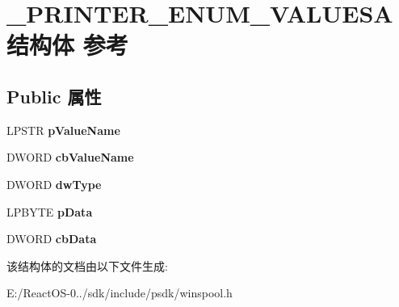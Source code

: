 \hypertarget{struct___p_r_i_n_t_e_r___e_n_u_m___v_a_l_u_e_s_a}{}\section{\+\_\+\+P\+R\+I\+N\+T\+E\+R\+\_\+\+E\+N\+U\+M\+\_\+\+V\+A\+L\+U\+E\+S\+A结构体 参考}
\label{struct___p_r_i_n_t_e_r___e_n_u_m___v_a_l_u_e_s_a}
\subsection*{Public 属性}
\begin{DoxyCompactItemize}
\item 
\mbox{\label{struct___p_r_i_n_t_e_r___e_n_u_m___v_a_l_u_e_s_a_aab628bb2cfed95c7d6f6a1a66b0fe324}} 
L\+P\+S\+TR {\bfseries p\+Value\+Name}
\item 
\mbox{\label{struct___p_r_i_n_t_e_r___e_n_u_m___v_a_l_u_e_s_a_a6e05ad750c02dfb03840b0259d27714e}} 
D\+W\+O\+RD {\bfseries cb\+Value\+Name}
\item 
\mbox{\label{struct___p_r_i_n_t_e_r___e_n_u_m___v_a_l_u_e_s_a_abba4c8ae179b5c3d4b42bbd3af4d451a}} 
D\+W\+O\+RD {\bfseries dw\+Type}
\item 
\mbox{\label{struct___p_r_i_n_t_e_r___e_n_u_m___v_a_l_u_e_s_a_a252bb88f6edcb08aae1ad2fad10f4cf1}} 
L\+P\+B\+Y\+TE {\bfseries p\+Data}
\item 
\mbox{\label{struct___p_r_i_n_t_e_r___e_n_u_m___v_a_l_u_e_s_a_a1fc1cd95c7ad77ce9fd4954642536e36}} 
D\+W\+O\+RD {\bfseries cb\+Data}
\end{DoxyCompactItemize}


该结构体的文档由以下文件生成\+:\begin{DoxyCompactItemize}
\item 
E\+:/\+React\+O\+S-\/0../sdk/include/psdk/winspool.\+h\end{DoxyCompactItemize}
